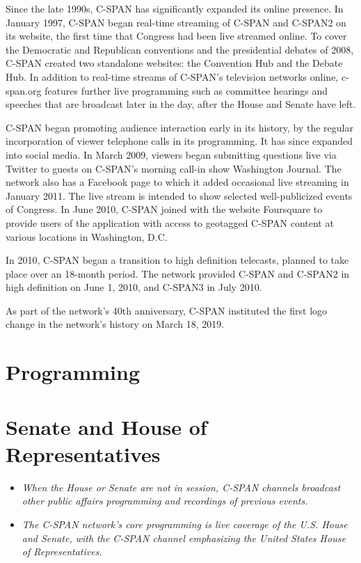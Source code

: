 Since the late 1990s, C-SPAN has significantly expanded its online
presence. In January 1997, C-SPAN began real-time streaming of C-SPAN
and C-SPAN2 on its website, the first time that Congress had been live
streamed online. To cover the Democratic and Republican conventions and
the presidential debates of 2008, C-SPAN created two standalone
websites: the Convention Hub and the Debate Hub. In addition to
real-time streams of C-SPAN's television networks online, c-span.org
features further live programming such as committee hearings and
speeches that are broadcast later in the day, after the House and Senate
have left.

C-SPAN began promoting audience interaction early in its history, by the
regular incorporation of viewer telephone calls in its programming. It
has since expanded into social media. In March 2009, viewers began
submitting questions live via Twitter to guests on C-SPAN's morning
call-in show Washington Journal. The network also has a Facebook page to
which it added occasional live streaming in January 2011. The live
stream is intended to show selected well-publicized events of Congress.
In June 2010, C-SPAN joined with the website Foursquare to provide users
of the application with access to geotagged C-SPAN content at various
locations in Washington, D.C.

In 2010, C-SPAN began a transition to high definition telecasts, planned
to take place over an 18-month period. The network provided C-SPAN and
C-SPAN2 in high definition on June 1, 2010, and C-SPAN3 in July 2010.

As part of the network's 40th anniversary, C-SPAN instituted the first
logo change in the network's history on March 18, 2019.

\section{Programming}\label{programming}

\section{Senate and House of
Representatives}\label{senate-and-house-of-representatives}

\begin{itemize}
\item
  \emph{When the House or Senate are not in session, C-SPAN channels
  broadcast other public affairs programming and recordings of previous
  events.}
\item
  \emph{The C-SPAN network's core programming is live coverage of the
  U.S. House and Senate, with the C-SPAN channel emphasizing the United
  States House of Representatives.}
\end{itemize}

